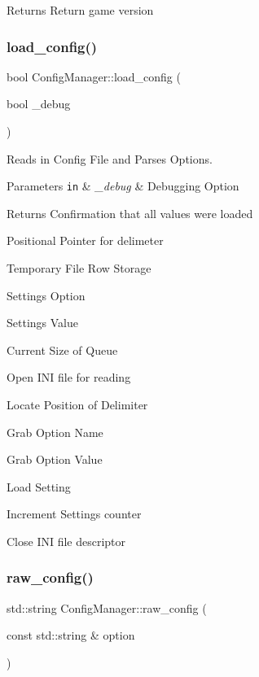 \begin{DoxyReturn}{Returns}
Return game version 
\end{DoxyReturn}
\mbox{\label{classConfigManager_a15a06af24f82a421d287501d3c28ec53}} 
\subsubsection{\texorpdfstring{load\+\_\+config()}{load\_config()}}
{\footnotesize\ttfamily bool Config\+Manager\+::load\+\_\+config (\begin{DoxyParamCaption}\item[{bool}]{\+\_\+debug }\end{DoxyParamCaption})}



Reads in Config File and Parses Options. 


\begin{DoxyParams}[1]{Parameters}
\mbox{\tt in}  & {\em \+\_\+debug} & Debugging Option \\
\hline
\end{DoxyParams}
\begin{DoxyReturn}{Returns}
Confirmation that all values were loaded 
\end{DoxyReturn}
Positional Pointer for delimeter

Temporary File Row Storage

Settings Option

Settings Value

Current Size of Queue

Open I\+NI file for reading

Locate Position of Delimiter

Grab Option Name

Grab Option Value

Load Setting

Increment Settings counter

Close I\+NI file descriptor \mbox{\label{classConfigManager_a2dac3f46c52eb3c53843abca84a74793}} 
\subsubsection{\texorpdfstring{raw\+\_\+config()}{raw\_config()}}
{\footnotesize\ttfamily std\+::string Config\+Manager\+::raw\+\_\+config (\begin{DoxyParamCaption}\item[{const std\+::string \&}]{option }\end{DoxyParamCaption})}



